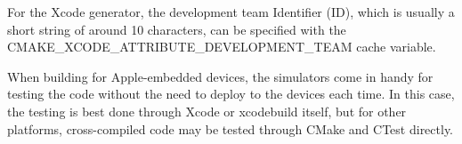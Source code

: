 For the Xcode generator, the development team Identifier (ID), which is usually a short string of around 10 characters, can be specified with the CMAKE\_XCODE\_ATTRIBUTE\_DEVELOPMENT\_TEAM cache variable.

When building for Apple-embedded devices, the simulators come in handy for testing the code without the need to deploy to the devices each time. In this case, the testing is best done through Xcode or xcodebuild itself, but for other platforms, cross-compiled code may be tested through CMake and CTest directly.



























